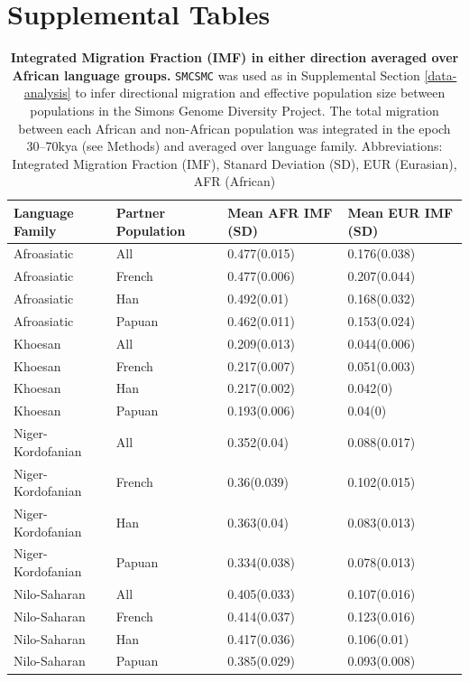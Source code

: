 \documentclass{article}
\begin{document}
\clearpage

\section{Supplemental Tables}

\begin{table}[ht]
\centering
\begin{tabular}{llll}
  \hline
Language Family & Partner Population & Mean AFR IMF (SD) & Mean EUR IMF (SD) \\ 
  \hline
Afroasiatic & All & 0.477(0.015) & 0.176(0.038) \\ 
  Afroasiatic & French & 0.477(0.006) & 0.207(0.044) \\ 
  Afroasiatic & Han & 0.492(0.01) & 0.168(0.032) \\ 
  Afroasiatic & Papuan & 0.462(0.011) & 0.153(0.024) \\ 
  Khoesan & All & 0.209(0.013) & 0.044(0.006) \\ 
  Khoesan & French & 0.217(0.007) & 0.051(0.003) \\ 
  Khoesan & Han & 0.217(0.002) & 0.042(0) \\ 
  Khoesan & Papuan & 0.193(0.006) & 0.04(0) \\ 
  Niger-Kordofanian & All & 0.352(0.04) & 0.088(0.017) \\ 
  Niger-Kordofanian & French & 0.36(0.039) & 0.102(0.015) \\ 
  Niger-Kordofanian & Han & 0.363(0.04) & 0.083(0.013) \\ 
  Niger-Kordofanian & Papuan & 0.334(0.038) & 0.078(0.013) \\ 
  Nilo-Saharan & All & 0.405(0.033) & 0.107(0.016) \\ 
  Nilo-Saharan & French & 0.414(0.037) & 0.123(0.016) \\ 
  Nilo-Saharan & Han & 0.417(0.036) & 0.106(0.01) \\ 
  Nilo-Saharan & Papuan & 0.385(0.029) & 0.093(0.008) \\ 
   \hline
\end{tabular}
\caption{{\bf Integrated Migration Fraction (IMF) in either direction averaged over African language groups.} {\tt SMCSMC} was used as in Supplemental Section \ref{data-analysis} to infer directional migration and effective population size between populations in the Simons Genome Diversity Project. The total migration between each African and non-African population was integrated in the epoch 30--70kya (see Methods) and averaged over language family. Abbreviations: Integrated Migration Fraction (IMF), Stanard Deviation (SD), EUR (Eurasian), AFR (African)} 
\label{average_sgdp_migration_table}
\end{table}
\end{document}
